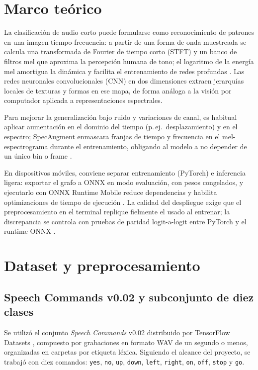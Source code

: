 \documentclass[conference]{IEEEtran}
\begin{document}
\section{Marco teórico}

La clasificación de audio corto puede formularse como reconocimiento de patrones en una imagen tiempo-frecuencia: a partir de una forma de onda muestreada se calcula una transformada de Fourier de tiempo corto (STFT) y un banco de filtros mel que aproxima la percepción humana de tono; el logaritmo de la energía mel amortigua la dinámica y facilita el entrenamiento de redes profundas \cite{torchaudio_docs}. Las redes neuronales convolucionales (CNN) en dos dimensiones extraen jerarquías locales de texturas y formas en ese mapa, de forma análoga a la visión por computador aplicada a representaciones espectrales.

Para mejorar la generalización bajo ruido y variaciones de canal, es habitual aplicar aumentación en el dominio del tiempo (p.\,ej.\ desplazamiento) y en el espectro; SpecAugment enmascara franjas de tiempo y frecuencia en el mel-espectrograma durante el entrenamiento, obligando al modelo a no depender de un único bin o frame \cite{specaugment}.

En dispositivos móviles, conviene separar entrenamiento (PyTorch) e inferencia ligera: exportar el grafo a ONNX en modo evaluación, con pesos congelados, y ejecutarlo con ONNX Runtime Mobile reduce dependencias y habilita optimizaciones de tiempo de ejecución \cite{onnxruntime}. La calidad del despliegue exige que el preprocesamiento en el terminal replique fielmente el usado al entrenar; la discrepancia se controla con pruebas de paridad logit-a-logit entre PyTorch y el runtime ONNX \cite{onnxruntime}.

\section{Dataset y preprocesamiento}

\subsection{Speech Commands v0.02 y subconjunto de diez clases}
Se utilizó el conjunto \textit{Speech Commands} v0.02 distribuido por TensorFlow Datasets \cite{tensorflow_datasets_speech_commands}, compuesto por grabaciones en formato WAV de un segundo o menos, organizadas en carpetas por etiqueta léxica. Siguiendo el alcance del proyecto, se trabajó con diez comandos: \texttt{yes}, \texttt{no}, \texttt{up}, \texttt{down}, \texttt{left}, \texttt{right}, \texttt{on}, \texttt{off}, \texttt{stop} y \texttt{go}.
\end{document}
